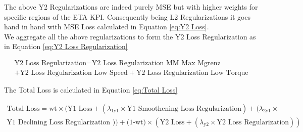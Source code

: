 \documentclass{report} %
\begin{document}
The above Y2 Regularizations are indeed purely \ac{MSE} but with higher weights for specific regions of the ETA \ac{KPI}.
Consequently being L2 Regularizations it goes hand in hand with \ac{MSE} Loss calculated in Equation \ref{eq:Y2 Loss}.\\

We aggregate all the above regularizations to form the Y2 Loss Regularization as in Equation \ref{eq:Y2 Loss Regularization}

\begin{equation}
    \begin{split}
\text{Y2 Loss Regularization} = \text{Y2 Loss Regularization MM Max Mgrenz} \\
    + \text{Y2 Loss Regularization Low Speed} + \text{Y2 Loss Regularization Low Torque}
    \end{split}
    \label{eq:Y2 Loss Regularization}
\end{equation}


\vspace{0.2cm} %

The Total Loss is calculated in Equation \ref{eq:Total Loss}

\vspace{0.2cm} %

\begin{equation}
    \begin{split}
\text{Total Loss} = \text{wt} \times (\text{Y1 Loss} + (\lambda_{\text{1y1}} \times \text{Y1 Smoothening Loss Regularization}) +  (\lambda_{\text{2y1}} \times \\
\text{Y1 Declining Loss Regularization })) + \text{(1-wt)} \times (\text{Y2 Loss} + (\lambda_{\text{y2}} \times \text{Y2 Loss Regularization}))
    \end{split}
    \label{eq:Total Loss}
\end{equation}

\end{document}

